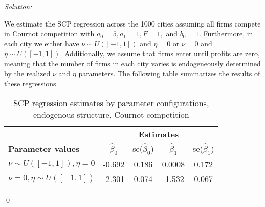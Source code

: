 \documentclass[12pt]{article}
\newenvironment{problem}[2][Problem]{\begin{trivlist}
\item[\hskip \labelsep {\bfseries #1}\hskip \labelsep {\bfseries #2.}]}{\end{trivlist}}
\newenvironment{sol}
    {\emph{Solution:}
    }
    {
    \qed
    }
\begin{document}
\begin{problem}{3}
\end{problem}
\begin{sol}
   We estimate the SCP regression across the 1000 cities assuming all firms compete in Cournot competition with $a_0 = 5, a_1 = 1, F = 1, $ and $b_0 = 1$. Furthermore, in each city we either have $\nu \sim U([-1, 1])$ and $\eta = 0$ or $\nu = 0$ and $\eta \sim U([-1,1])$. Additionally, we assume that firms enter until profits are zero, meaning that the number of firms in each city varies is endogeneously determined by the realized $\nu$ and $\eta$ parameters. The following table summarizes the results of these regressions.
      \begin{table}[!ht] %
         \centering %
         \begin{tabular}{l c c c c} %
         \toprule %
         & \multicolumn{4}{c}{\textbf{Estimates}} \\ %
         \cmidrule(l){2-5} %
         \textbf{Parameter values} & $\hat{\beta}_0$ & se($\hat{\beta}_0$) & $\hat{\beta}_1$ & se($\hat{\beta}_1$)\\ %
         \midrule %
         $\nu \sim U([-1,1]), \eta = 0 $& -0.692 & 0.186 & 0.0008 & 0.172 \\ %
         $\nu =0, \eta \sim U([-1,1])$ & -2.301 & 0.074 & -1.532 & 0.067 \\ %
         \bottomrule %
         \end{tabular}
         \caption{SCP regression estimates by parameter configurations, endogenous structure, Cournot competition} %

\end{table}
\end{sol}
\end{document}
